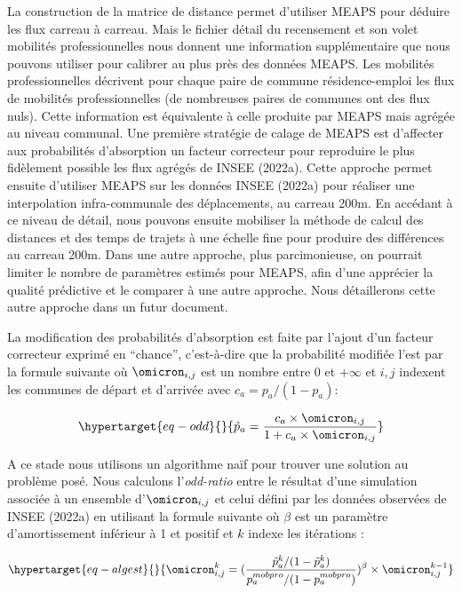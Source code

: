 \documentclass[
  10pt,
  a4paper,
  numbers=noendperiod,
  DIV=12]{scrartcl}
\begin{document}
La construction de la matrice de distance permet d'utiliser MEAPS pour
déduire les flux carreau à carreau. Mais le fichier détail du
recensement et son volet mobilités professionnelles nous donnent une
information supplémentaire que nous pouvons utiliser pour calibrer au
plus près des données MEAPS. Les mobilités professionnelles décrivent
pour chaque paire de commune résidence-emploi les flux de mobilités
professionnelles (de nombreuses paires de communes ont des flux nuls).
Cette information est équivalente à celle produite par MEAPS mais
agrégée au niveau communal. Une première stratégie de calage de MEAPS
est d'affecter aux probabilités d'absorption un facteur correcteur pour
reproduire le plus fidèlement possible les flux agrégés de INSEE
(2022a). Cette approche permet ensuite d'utiliser MEAPS sur les données
INSEE (2022a) pour réaliser une interpolation infra-communale des
déplacements, au carreau 200m. En accédant à ce niveau de détail, nous
pouvons ensuite mobiliser la méthode de calcul des distances et des
temps de trajets à une échelle fine pour produire des différences au
carreau 200m. Dans une autre approche, plus parcimonieuse, on pourrait
limiter le nombre de paramètres estimés pour MEAPS, afin d'une apprécier
la qualité prédictive et le comparer à une autre approche. Nous
détaillerons cette autre approche dans un futur document.

La modification des probabilités d'absorption est faite par l'ajout d'un
facteur correcteur exprimé en ``chance'', c'est-à-dire que la
probabilité modifiée l'est par la formule suivante où \(\omicron_{i,j}\)
est un nombre entre \(0\) et \(+\infty\) et \(i,j\) indexent les
communes de départ et d'arrivée avec \(c_a = p_a/(1-p_a)\):

\begin{equation}\protect\hypertarget{eq-odd}{}{
\tilde{p}_a = \frac{c_a \times \omicron_{i,j}} {1+c_a \times \omicron_{i,j}} 
}\label{eq-odd}\end{equation}

A ce stade nous utilisons un algorithme naïf pour trouver une solution
au problème posé. Nous calculons l'\emph{odd-ratio} entre le résultat
d'une simulation associée à un ensemble d'\(\omicron_{i,j}\) et celui
défini par les données observées de INSEE (2022a) en utilisant la
formule suivante où \(\beta\) est un paramètre d'amortissement inférieur
à 1 et positif et \(k\) indexe les itérations :

\begin{equation}\protect\hypertarget{eq-algest}{}{
\omicron^k_{i,j} = (\frac{\tilde{p}^k_a/(1-\tilde{p}^k_a)}{
p^{mobpro}_a/(1-p^{mobpro}_a)})^\beta \times \omicron^{k-1}_{i,j}
}\label{eq-algest}\end{equation}
\end{document}
